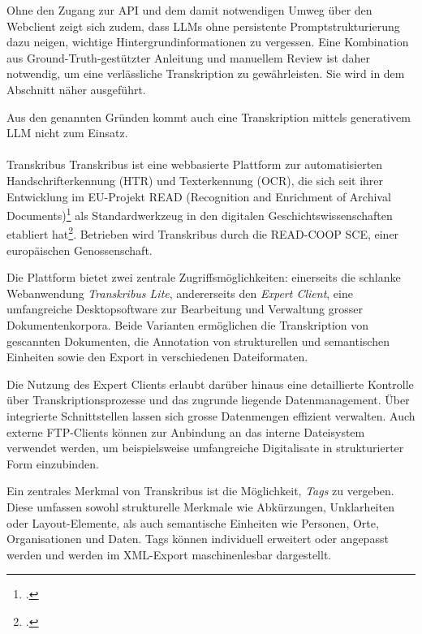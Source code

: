 \documentclass[12pt, a4paper, ngerman, bidi=default]{article}
\makeatletter
\let\cite\footcite
\let\oldparagraph\paragraph%
\renewcommand{\paragraph}{
    \@ifstar%
      \xxxParagraphStar%
      \xxxParagraphNoStar%
 }
\newcommand{\xxxParagraphStar}[1]{\oldparagraph*{#1}\mbox{}}
\newcommand{\xxxParagraphNoStar}[1]{\oldparagraph{#1}\mbox{}}
\makeatother
\begin{document}
Ohne den Zugang zur API und dem damit notwendigen Umweg über den Webclient zeigt sich 
zudem, dass LLMs ohne persistente Promptstrukturierung dazu neigen, wichtige Hintergrundinformationen zu vergessen. 
Eine Kombination aus Ground-Truth-gestützter Anleitung und manuellem Review ist daher notwendig, um eine verlässliche Transkription zu gewährleisten. Sie wird in dem Abschnitt  näher ausgeführt.

Aus den genannten Gründen kommt auch eine Transkription mittels generativem LLM nicht zum Einsatz.

\paragraph{Transkribus}\label{Transkribus}
Transkribus ist eine webbasierte Plattform zur automatisierten Handschrifterkennung (HTR) und Texterkennung (OCR), die sich seit ihrer Entwicklung im EU-Projekt READ 
(Recognition and Enrichment of Archival Documents)\cite[vgl.][]{noauthor_recognition_nodate} als Standardwerkzeug in den digitalen Geschichtswissenschaften etabliert 
hat\cite[vgl.][]{muhlberger_transkribus_2019}. Betrieben wird Transkribus durch die READ-COOP SCE, einer europäischen Genossenschaft.

Die Plattform bietet zwei zentrale Zugriffsmöglichkeiten: einerseits die schlanke Webanwendung \textit{Transkribus Lite}, andererseits den \textit{Expert Client}, 
eine umfangreiche Desktopsoftware zur Bearbeitung und Verwaltung grosser Dokumentenkorpora. Beide Varianten ermöglichen die Transkription von gescannten Dokumenten, 
die Annotation von strukturellen und semantischen Einheiten sowie den Export in verschiedenen Dateiformaten. 

Die Nutzung des Expert Clients erlaubt darüber hinaus eine detaillierte Kontrolle über Transkriptionsprozesse und das zugrunde liegende Datenmanagement. 
Über integrierte Schnittstellen lassen sich grosse Datenmengen effizient verwalten. Auch externe FTP-Clients können zur Anbindung an das interne Dateisystem verwendet werden, 
um beispielsweise umfangreiche Digitalisate in strukturierter Form einzubinden.

Ein zentrales Merkmal von Transkribus ist die Möglichkeit, \textit{Tags} zu vergeben. Diese umfassen sowohl strukturelle Merkmale wie Abkürzungen, Unklarheiten oder Layout-Elemente, 
als auch semantische Einheiten wie Personen, Orte, Organisationen und Daten. Tags können individuell erweitert oder angepasst werden und werden im XML-Export maschinenlesbar dargestellt.
\end{document}
